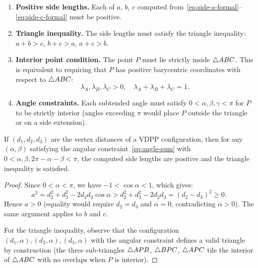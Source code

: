 \begin{enumerate}[label=(\alph*)]
    \item \textbf{Positive side lengths.} Each of $a$, $b$, $c$ computed from~\eqref{eq:side-a-formal}--\eqref{eq:side-c-formal} must be positive.

    \item \textbf{Triangle inequality.} The side lengths must satisfy the triangle inequality: $a + b > c$, $b + c > a$, $a + c > b$.

    \item \textbf{Interior point condition.} The point $P$ must lie strictly inside $\triangle ABC$. This is equivalent to requiring that $P$ has positive barycentric coordinates with respect to $\triangle ABC$:
    \begin{equation}
    \lambda_A, \lambda_B, \lambda_C > 0, \quad \lambda_A + \lambda_B + \lambda_C = 1.
    \end{equation}

    \item \textbf{Angle constraints.} Each subtended angle must satisfy $0 < \alpha, \beta, \gamma < \pi$ for $P$ to be strictly interior (angles exceeding $\pi$ would place $P$ outside the triangle or on a side extension).
\end{enumerate}

\begin{proposition}
\label{prop:necessary}
If $(d_1, d_2, d_3)$ are the vertex distances of a VDPP configuration, then for any $(\alpha, \beta)$ satisfying the angular constraint~\eqref{eq:angle-sum} with $0 < \alpha, \beta, 2\pi - \alpha - \beta < \pi$, the computed side lengths are positive and the triangle inequality is satisfied.
\end{proposition}

\begin{proof}
Since $0 < \alpha < \pi$, we have $-1 < \cos\alpha < 1$, which gives:
\[
a^2 = d_2^2 + d_3^2 - 2d_2 d_3\cos\alpha > d_2^2 + d_3^2 - 2d_2 d_3 = (d_2 - d_3)^2 \geq 0.
\]
Hence $a > 0$ (equality would require $d_2 = d_3$ and $\alpha = 0$, contradicting $\alpha > 0$). The same argument applies to $b$ and $c$.

For the triangle inequality, observe that the configuration $(d_1, \alpha), (d_2, \alpha), (d_3, \alpha)$ with the angular constraint defines a valid triangle by construction (the three sub-triangles $\triangle APB$, $\triangle BPC$, $\triangle APC$ tile the interior of $\triangle ABC$ with no overlaps when $P$ is interior).
\end{proof}

